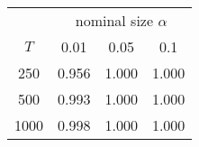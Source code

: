 % 
\begin{tabular}{cccc}
  \hline
  & \multicolumn{3}{c}{nominal size $\alpha$} \\
 $T$ & 0.01 & 0.05 & 0.1 \\
 \hline
250 & 0.956 & 1.000 & 1.000 \\ 
  500 & 0.993 & 1.000 & 1.000 \\ 
  1000 & 0.998 & 1.000 & 1.000 \\ 
   \hline
\end{tabular}
